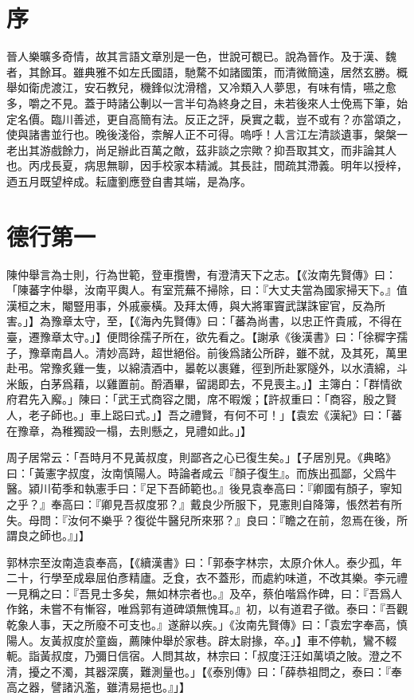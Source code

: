 \chapter{序}

晉人樂曠多奇情，故其言語文章別是一色，世說可覩已。說為晉作。及于漢、魏者，其餘耳。雖典雅不如左氏國語，馳騖不如諸國策，而清微簡遠，居然玄勝。概舉如衛虎渡江，安石教兒，機鋒似沈滑稽，又冷類入人夢思，有味有情，嚥之愈多，嚼之不見。蓋于時諸公剸以一言半句為終身之目，未若後來人士俛焉下筆，始定名價。臨川善述，更自高簡有法。反正之評，戾實之載，豈不或有？亦當頌之，使與諸書並行也。晚後淺俗，柰解人正不可得。嗚呼！人言江左清談遺事，槃槃一老出其游戲餘力，尚足辦此百萬之敵，茲非談之宗歟？抑吾取其文，而非論其人也。丙戌長夏，病思無聊，因手校家本精滅。其長註，間疏其滯義。明年以授梓，迺五月既望梓成。耘廬劉應登自書其端，是為序。

\chapter{德行第一}

陳仲舉言為士則，行為世範，登車攬轡，有澄清天下之志。【《汝南先賢傳》曰：「陳蕃字仲舉，汝南平輿人。有室荒蕪不掃除，曰：『大丈夫當為國家掃天下。』值漢桓之末，閹豎用事，外戚豪橫。及拜太傅，與大將軍竇武謀誅宦官，反為所害。」】為豫章太守，至，【《海內先賢傳》曰：「蕃為尚書，以忠正忤貴戚，不得在臺，遷豫章太守。」】便問徐孺子所在，欲先看之。【謝承《後漢書》曰：「徐穉字孺子，豫章南昌人。清妙高跱，超世絕俗。前後爲諸公所辟，雖不就，及其死，萬里赴弔。常豫炙雞⼀隻，以綿漬酒中，㬥乾以裹雞，徑到所赴冢隧外，以水漬綿，斗米飯，白茅爲藉，以雞置前。酹酒畢，留謁即去，不見喪主。」】主簿白：「群情欲府君先入廨。」陳曰：「武王式商容之閭，席不暇煖；【許叔重曰：「商容，殷之賢人，老子師也。」車上跽曰式。」】吾之禮賢，有何不可！」【袁宏《漢紀》曰：「蕃在豫章，為稚獨設一榻，去則懸之，見禮如此。」】

周子居常云：「吾時月不見黃叔度，則鄙吝之心已復生矣。」【子居別見。《典略》曰：「黃憲字叔度，汝南慎陽人。時論者咸云『顏子復生』。而族出孤鄙，父爲牛醫。潁川荀季和執憲手曰：『足下吾師範也。』後見袁奉高曰：『卿國有顏子，寧知之乎？』奉高曰：『卿見吾叔度邪？』戴良少所服下，見憲則自降簿，悵然若有所失。母問：『汝何不樂乎？復從牛醫兒所來邪？』良曰：『瞻之在前，忽焉在後，所謂良之師也。』」】

郭林宗至汝南造袁奉高，【《續漢書》曰：「郭泰字林宗，太原介休人。泰少孤，年二十，行學至成皋屈伯彥精廬。乏食，衣不蓋形，而處約味道，不改其樂。李元禮⼀見稱之曰：『吾見士多矣，無如林宗者也。』及卒，蔡伯喈爲作碑，曰：『吾爲人作銘，未嘗不有慚容，唯爲郭有道碑頌無愧耳。』初，以有道君子徵。泰曰：『吾觀乾象人事，天之所廢不可支也。』遂辭以疾。」《汝南先賢傳》曰：「袁宏字奉高，慎陽人。友黃叔度於童齒，薦陳仲舉於家巷。辟太尉掾，卒。」】車不停軌，鸞不輟軛。詣黃叔度，乃彌日信宿。人問其故，林宗曰：「叔度汪汪如萬頃之陂。澄之不清，擾之不濁，其器深廣，難測量也。」【《泰別傳》曰：「薛恭祖問之，泰曰：『奉高之器，譬諸汎濫，雖清易挹也。』」】

